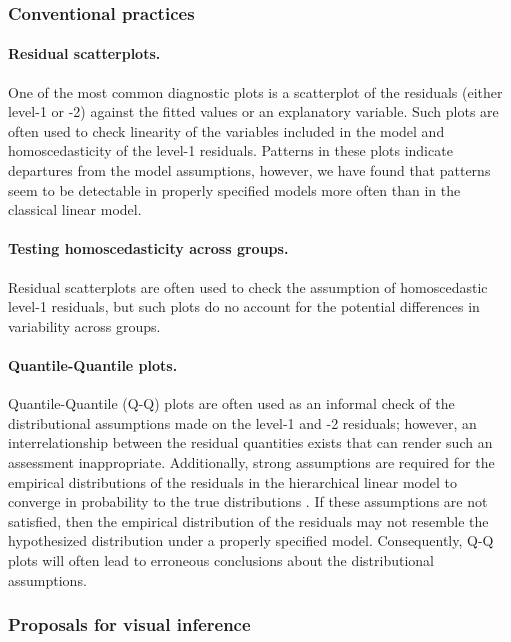 \documentclass{article} %
\begin{document}
\subsubsection{Conventional practices}

\paragraph{Residual scatterplots.} 
One of the most common diagnostic plots is a scatterplot of the residuals (either level-1 or -2) against the fitted values or an explanatory variable. Such plots are often used to check linearity of the variables included in the model and homoscedasticity of the level-1 residuals. Patterns in these plots indicate departures from the model assumptions, however, we have found that patterns seem to be detectable in properly specified models more often than in the classical linear model.

\paragraph{Testing homoscedasticity across groups.}
Residual scatterplots are often used to check the assumption of homoscedastic level-1 residuals, but such plots do no account for the potential differences in variability across groups. 

\paragraph{Quantile-Quantile plots.}
Quantile-Quantile (Q-Q) plots are often used as an informal check of the distributional assumptions made on the level-1 and -2 residuals; however, an interrelationship between the residual quantities exists that can render such an assessment inappropriate. Additionally, strong assumptions are required for the empirical distributions of the residuals in the hierarchical linear model to converge in probability to the true distributions \citep[Theorem 3.2 and Lemma 3.1]{Jiang:1998vt}. If these assumptions are not satisfied, then the empirical distribution of the residuals may not resemble the hypothesized distribution under a properly specified model. Consequently, Q-Q plots will often lead to erroneous conclusions about the distributional assumptions.


\subsubsection{Proposals for visual inference}
\end{document}
